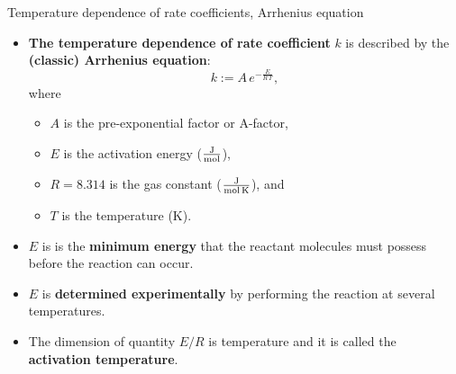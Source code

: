 %
%
\begin{frame}{Temperature dependence of rate coefficients, Arrhenius equation}
	\begin{itemize}
		\item {\bf The temperature dependence of rate coefficient} $k$ is	described by the \alert{\bf (classic) Arrhenius equation}:
		\[
		k := A\, e^{-\tfrac{E}{R\, T}},\]
		where 
		\begin{itemize}
			\item $A$ is the pre-exponential factor or A-factor,
			\item $E$ is the activation energy ($\tfrac{\rm J}{\rm mol}$), 
			\item $R = 8.314$ is the gas constant ($\tfrac{\rm J}{\rm mol \, K}$), and 
			\item $T$ is the temperature (K).
		\end{itemize}
		\pause
		\item $E$ is is the {\bf minimum energy} that the reactant molecules must possess before the reaction can occur.
		\pause
		\item $E$ is {\bf determined experimentally} by performing the reaction at several temperatures. 
		\pause
		\item The dimension of quantity $E/R$ is temperature and it is called the \alert{\bf activation temperature}. 
	\end{itemize}
\end{frame}
%
